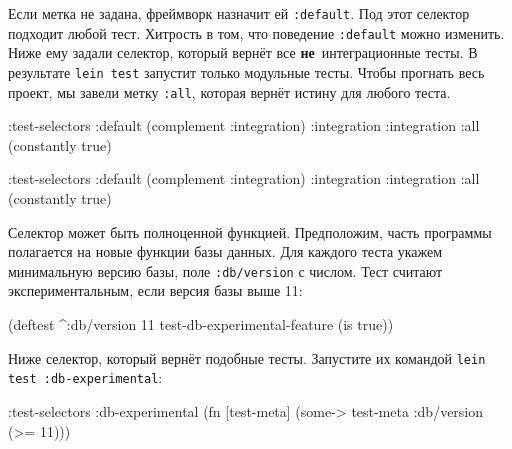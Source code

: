 \begin{english}
\end{english}


Если метка не задана, фреймворк назначит ей \verb|:default|. Под этот селектор
подходит любой тест. Хитрость в том, что поведение \verb|:default| можно
изменить. Ниже ему задали селектор, который вернёт все
\textbf{не}~интеграционные тесты. В результате \verb|lein test| запустит только
модульные тесты. Чтобы прогнать весь проект, мы завели метку \verb|:all|,
которая вернёт истину для любого теста.

\ifx\devicetype\mobile

\begin{english}
  \begin{clojure}
:test-selectors
  {:default (complement :integration)
   :integration :integration
   :all (constantly true)}
  \end{clojure}
\end{english}

\else

\begin{english}
  \begin{clojure}
:test-selectors {:default (complement :integration)
                 :integration :integration
                 :all (constantly true)}
  \end{clojure}
\end{english}

\fi

Селектор может быть полноценной функцией. Предположим, часть программы
полагается на новые функции базы данных. Для каждого теста укажем минимальную
версию базы, поле \verb|:db/version| с числом. Тест считают экспериментальным,
если версия базы выше 11:

\begin{english}
  \begin{clojure}
(deftest ^{:db/version 11}
  test-db-experimental-feature
  (is true))
  \end{clojure}
\end{english}

\noindent
Ниже селектор, который вернёт подобные тесты. Запустите их командой
\verb|lein test :db-experimental|:

\ifx\devicetype\mobile

\begin{english}
  \begin{clojure}
:test-selectors
  {:db-experimental
   (fn [test-meta]
     (some-> test-meta
             :db/version
             (>= 11)))}
  \end{clojure}
\end{english}

